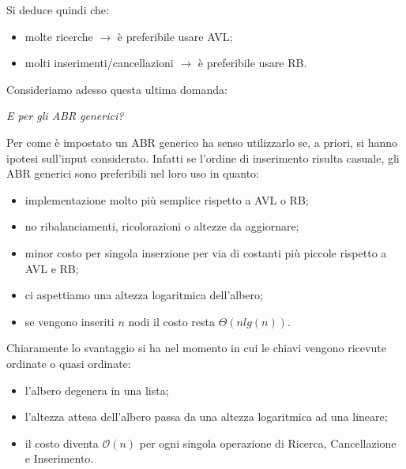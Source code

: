 Si deduce quindi che:
\begin{itemize}
	\item molte ricerche $\rightarrow$ è preferibile usare AVL;
	\item molti inserimenti/cancellazioni $\rightarrow$ è preferibile usare RB.
\end{itemize}
Consideriamo adesso questa ultima domanda:
\begin{tcolorbox}[colback=lightgray!20,%
	colframe=black,%
	arc=3mm, auto outer arc,]\centering\textit{E per gli ABR generici?}
\end{tcolorbox}
Per come è impostato un ABR generico ha senso utilizzarlo se, a priori, si hanno ipotesi sull'input considerato. Infatti se l'ordine di inserimento risulta casuale, gli ABR generici sono preferibili nel loro uso in quanto:
\begin{itemize}
	\item implementazione molto più semplice rispetto a AVL o RB;
	\item no ribalanciamenti, ricolorazioni o altezze da aggiornare;
	\item minor costo per singola inserzione per via di costanti più piccole rispetto a AVL e RB;
	\item ci aspettiamo una altezza logaritmica dell'albero;
	\item se vengono inseriti $n$ nodi il costo resta $\Theta(nlg(n))$.
	
\end{itemize}
Chiaramente lo svantaggio si ha nel momento in cui le chiavi vengono ricevute ordinate o quasi ordinate:
\begin{itemize}
	\item l'albero degenera in una lista;
	\item l'altezza attesa dell'albero passa da una altezza logaritmica ad una lineare;
	\item il costo diventa $\mathcal{O}(n)$ per ogni singola operazione di Ricerca, Cancellazione e Inserimento.
\end{itemize}
